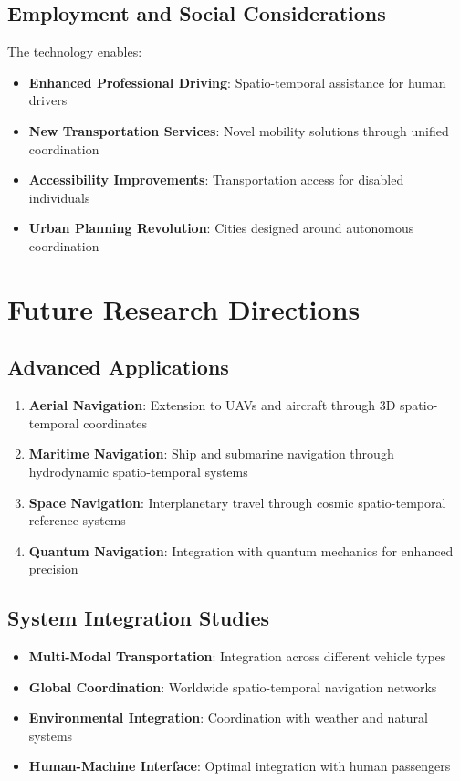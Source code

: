 \documentclass[12pt,a4paper]{article}
\begin{document}
\subsection{Employment and Social Considerations}

The technology enables:

\begin{itemize}
\item \textbf{Enhanced Professional Driving}: Spatio-temporal assistance for human drivers
\item \textbf{New Transportation Services}: Novel mobility solutions through unified coordination
\item \textbf{Accessibility Improvements}: Transportation access for disabled individuals
\item \textbf{Urban Planning Revolution}: Cities designed around autonomous coordination
\end{itemize}

\section{Future Research Directions}

\subsection{Advanced Applications}

\begin{enumerate}
\item \textbf{Aerial Navigation}: Extension to UAVs and aircraft through 3D spatio-temporal coordinates
\item \textbf{Maritime Navigation}: Ship and submarine navigation through hydrodynamic spatio-temporal systems
\item \textbf{Space Navigation}: Interplanetary travel through cosmic spatio-temporal reference systems
\item \textbf{Quantum Navigation}: Integration with quantum mechanics for enhanced precision
\end{enumerate}

\subsection{System Integration Studies}

\begin{itemize}
\item \textbf{Multi-Modal Transportation}: Integration across different vehicle types
\item \textbf{Global Coordination}: Worldwide spatio-temporal navigation networks
\item \textbf{Environmental Integration}: Coordination with weather and natural systems
\item \textbf{Human-Machine Interface}: Optimal integration with human passengers
\end{itemize}
\end{document}
